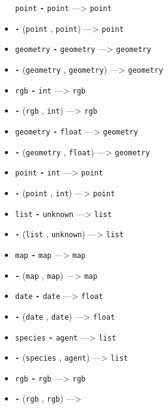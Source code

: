 \documentclass[]{book}
\theoremstyle{definition}
\theoremstyle{definition}
\theoremstyle{definition}
\theoremstyle{remark}
\begin{document}
\begin{itemize}
  \texttt{point} \textbf{\texttt{-}} \texttt{point} ---\textgreater{}
  \texttt{point}
\item
  \textbf{\texttt{-}} (\texttt{point} , \texttt{point})
  ---\textgreater{} \texttt{point}
\item
  \texttt{geometry} \textbf{\texttt{-}} \texttt{geometry}
  ---\textgreater{} \texttt{geometry}
\item
  \textbf{\texttt{-}} (\texttt{geometry} , \texttt{geometry})
  ---\textgreater{} \texttt{geometry}
\item
  \texttt{rgb} \textbf{\texttt{-}} \texttt{int} ---\textgreater{}
  \texttt{rgb}
\item
  \textbf{\texttt{-}} (\texttt{rgb} , \texttt{int}) ---\textgreater{}
  \texttt{rgb}
\item
  \texttt{geometry} \textbf{\texttt{-}} \texttt{float} ---\textgreater{}
  \texttt{geometry}
\item
  \textbf{\texttt{-}} (\texttt{geometry} , \texttt{float})
  ---\textgreater{} \texttt{geometry}
\item
  \texttt{point} \textbf{\texttt{-}} \texttt{int} ---\textgreater{}
  \texttt{point}
\item
  \textbf{\texttt{-}} (\texttt{point} , \texttt{int}) ---\textgreater{}
  \texttt{point}
\item
  \texttt{list} \textbf{\texttt{-}} \texttt{unknown} ---\textgreater{}
  \texttt{list}
\item
  \textbf{\texttt{-}} (\texttt{list} , \texttt{unknown})
  ---\textgreater{} \texttt{list}
\item
  \texttt{map} \textbf{\texttt{-}} \texttt{map} ---\textgreater{}
  \texttt{map}
\item
  \textbf{\texttt{-}} (\texttt{map} , \texttt{map}) ---\textgreater{}
  \texttt{map}
\item
  \texttt{date} \textbf{\texttt{-}} \texttt{date} ---\textgreater{}
  \texttt{float}
\item
  \textbf{\texttt{-}} (\texttt{date} , \texttt{date}) ---\textgreater{}
  \texttt{float}
\item
  \texttt{species} \textbf{\texttt{-}} \texttt{agent} ---\textgreater{}
  \texttt{list}
\item
  \textbf{\texttt{-}} (\texttt{species} , \texttt{agent})
  ---\textgreater{} \texttt{list}
\item
  \texttt{rgb} \textbf{\texttt{-}} \texttt{rgb} ---\textgreater{}
  \texttt{rgb}
\item
  \textbf{\texttt{-}} (\texttt{rgb} , \texttt{rgb}) ---\textgreater{}

\end{itemize}
\end{document}
